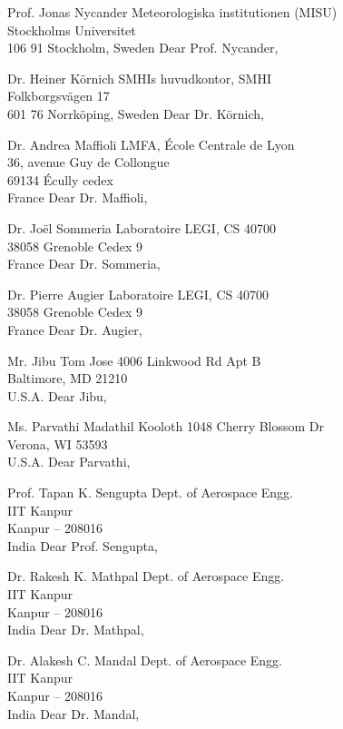 Prof. Jonas Nycander
Meteorologiska institutionen (MISU)\\Stockholms Universitet\\106 91 Stockholm, Sweden
Dear Prof. Nycander,

Dr. Heiner Körnich
SMHIs huvudkontor, SMHI\\Folkborgsvägen 17\\601 76 Norrköping, Sweden
Dear Dr. K\"ornich,

%

Dr. Andrea Maffioli
LMFA, École Centrale de Lyon\\36, avenue Guy de Collongue\\69134 Écully cedex\\France
Dear Dr. Maffioli,

Dr. Jo\"el Sommeria
Laboratoire LEGI, CS 40700\\38058 Grenoble Cedex 9\\France
Dear Dr. Sommeria,

Dr. Pierre Augier
Laboratoire LEGI, CS 40700\\38058 Grenoble Cedex 9\\France
Dear Dr. Augier,

%

Mr. Jibu Tom Jose
4006 Linkwood Rd Apt B\\Baltimore, MD 21210\\U.S.A.
Dear Jibu,

Ms. Parvathi Madathil Kooloth
1048 Cherry Blossom Dr\\Verona, WI 53593\\U.S.A.
Dear Parvathi,

Prof. Tapan K. Sengupta
Dept. of Aerospace Engg.\\IIT Kanpur\\Kanpur -- 208016\\India
Dear Prof. Sengupta,

Dr. Rakesh K. Mathpal
Dept. of Aerospace Engg.\\IIT Kanpur\\Kanpur -- 208016\\India
Dear Dr. Mathpal,

Dr. Alakesh C. Mandal
Dept. of Aerospace Engg.\\IIT Kanpur\\Kanpur -- 208016\\India
Dear Dr. Mandal,

